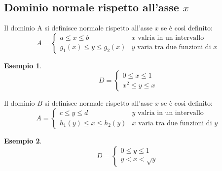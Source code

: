 \documentclass{book}
\newtheorem{esempio}{Esempio}
\begin{document}
\subsection{Dominio normale rispetto all'asse $x$}
Il dominio A si definisce {\color{red} normale} rispetto all'asse $x$ se è così
definito:
\begin{equation}
	A=\begin{cases}
		a\leq x\leq b & x \text{ valria in un intervallo}\\
		g_1(x)\leq y\leq g_2(x) & y \text{ varia tra due funzioni di }x
	\end{cases}
\end{equation}
\begin{esempio}
\begin{equation*}
	D=\begin{cases}
		0\leq x\leq 1\\
		x^2\leq y\leq x
	\end{cases}
\end{equation*}
\end{esempio}
Il dominio $B$ si definisce {\color{red} normale} rispetto all'asse $x$ se è così
definito:
\begin{equation}
	A=\begin{cases}
		c\leq y\leq d & y \text{ valria in un intervallo}\\
		h_1(y)\leq x\leq h_2(y) & x \text{ varia tra due funzioni di }y
	\end{cases}
\end{equation}
\begin{esempio}
\begin{equation*}
	D=\begin{cases}
		0\leq y\leq 1\\
		y< x< \sqrt{y}
	\end{cases}
\end{equation*}
\end{esempio}
\end{document}
